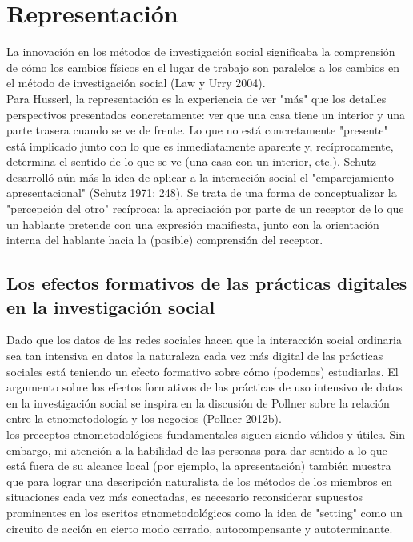 \section{Representación}
La innovación en los métodos de investigación social significaba la comprensión de cómo los cambios físicos en el lugar de trabajo son paralelos a los cambios en el método de investigación social (Law y Urry 2004).\\

Para Husserl, la representación es la experiencia de ver "más" que los detalles perspectivos presentados concretamente: ver que una casa tiene un interior y una parte trasera cuando se ve de frente. Lo que no está concretamente "presente" está implicado junto con lo que es inmediatamente aparente y, recíprocamente, determina el sentido de lo que se ve (una casa con un interior, etc.). Schutz desarrolló aún más la idea de aplicar a la interacción social el "emparejamiento apresentacional" (Schutz 1971: 248). Se trata de una forma de conceptualizar la "percepción del otro" recíproca: la apreciación por parte de un receptor de lo que un hablante pretende con una expresión manifiesta, junto con la orientación interna del hablante hacia la (posible) comprensión del receptor.


\subsection{Los efectos formativos de las prácticas digitales en la investigación social}
Dado que los datos de las redes sociales hacen que la interacción social ordinaria sea tan intensiva en datos la naturaleza cada vez más digital de las prácticas sociales está teniendo un efecto formativo sobre cómo (podemos) estudiarlas. El argumento sobre los efectos formativos de las prácticas de uso intensivo de datos en la investigación social se inspira en la discusión de Pollner sobre la relación entre la etnometodología y los negocios (Pollner 2012b). \\

los preceptos etnometodológicos fundamentales siguen siendo válidos y útiles. Sin embargo, mi atención a la habilidad de las personas para dar sentido a lo que está fuera de su alcance local (por ejemplo, la apresentación) también muestra que para lograr una descripción naturalista de los métodos de los miembros en situaciones cada vez más conectadas, es necesario reconsiderar supuestos prominentes en los escritos etnometodológicos como la idea de "setting" como un circuito de acción en cierto modo cerrado, autocompensante y autoterminante.\\


